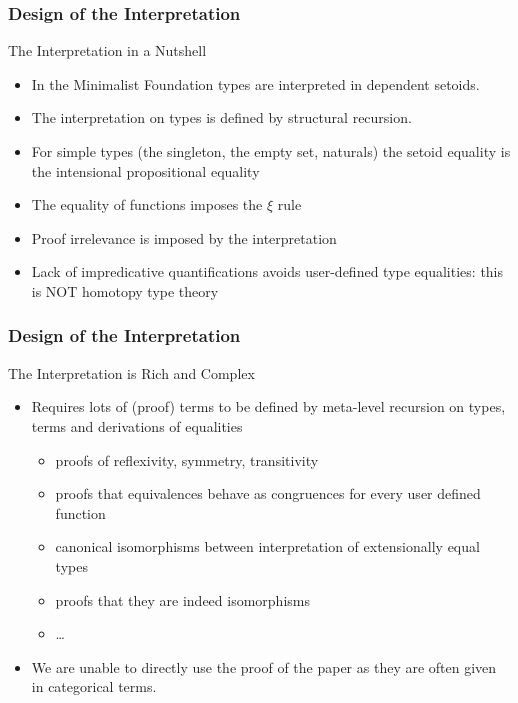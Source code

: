 \documentclass{beamer}
\begin{document}
\begin{frame}\frametitle{Design of the Interpretation}
\begin{block}{The Interpretation in a Nutshell}
\begin{itemize}
	\item In the Minimalist Foundation types are interpreted in dependent setoids.
	\item The interpretation on types is defined by structural recursion.
	\item For simple types (the singleton, the empty set, naturals) the setoid equality is the intensional propositional equality
        \item The equality of functions imposes the $\xi$ rule
        \item Proof irrelevance is imposed by the interpretation
        \item Lack of impredicative quantifications avoids user-defined
         type equalities: this is NOT homotopy type theory
\end{itemize}
\end{block}
\end{frame}

\begin{frame}\frametitle{Design of the Interpretation}
\begin{block}{The Interpretation is Rich and Complex}
\begin{itemize}
        \item Requires lots of (proof) terms to be defined by meta-level
         recursion on types, terms and derivations of equalities
         \begin{itemize}
          \item proofs of reflexivity, symmetry, transitivity
          \item proofs that equivalences behave as congruences for every user defined function
          \item canonical isomorphisms between interpretation of extensionally
           equal types
          \item proofs that they are indeed isomorphisms
          \item \ldots
         \end{itemize}
     	 \item We are unable to directly use the proof of the paper as they are often given in categorical terms.
\end{itemize}
\end{block}
\end{frame}
\end{document}
